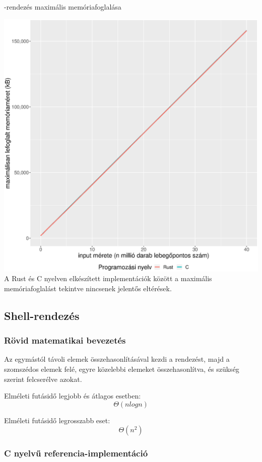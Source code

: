 \noindentKupac-rendezés maximális memóriafoglalása

\includegraphics[width=15.5cm]{kepek/heap_sort_memory.eps}
A Rust és C nyelven elkészített implementációk között a maximális memóriafoglalást tekintve nincsenek jelentős eltérések.

\subsection{Shell-rendezés}
\subsubsection{Rövid matematikai bevezetés}
Az egymástól távoli elemek összehasonlításával kezdi a rendezést, majd a szomszédos elemek felé, egyre közelebbi elemeket összehasonlítva, és szükség szerint felcserélve azokat. 

Elméleti futásidő legjobb és átlagos esetben:
\[\Theta(n log n) \]

Elméleti futásidő legrosszabb eset:
\[\Theta(n^2)\]

\subsubsection{C nyelvű referencia-implementáció}
